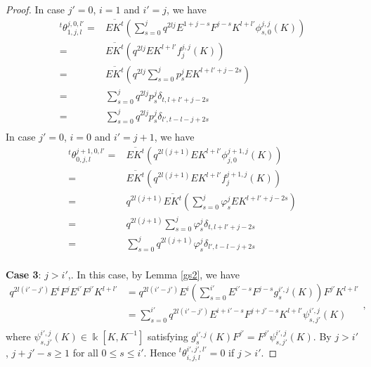\documentclass[10pt,oneside]{amsart}
\theoremstyle{definition}
\def\<{\leqslant}
\def\>{\geqslant}
\begin{document}
\begin{proof}
In case $j'=0$, $i=1$ and $i'=j$, we have
$$\begin{array}{rl}
{^t\theta^{j,0,l'}_{1,j,l}}
=&\overline{EK^t}(\sum_{s=0}^jq^{2lj}E^{1+j-s}F^{j-s}K^{l+l'}\phi^{j,j}_{s,0}(K))\\
=&\overline{EK^t}(q^{2lj}EK^{l+l'}f^{j,j}_j(K))\\
=&\overline{EK^t}(q^{2lj}\sum_{s=0}^jp^j_sEK^{l+l'+j-2s})\\
=&\sum_{s=0}^{j}q^{2lj}p^j_s\delta_{t,l+l'+j-2s}\\
=&\sum_{s=0}^{j}q^{2lj}p^j_s\delta_{l',t-l-j+2s}\\\end{array}$$
In case $j'=0$, $i=0$ and $i'=j+1$, we have
$$\begin{array}{rl}
{^t\theta^{j+1,0,l'}_{0,j,l}}
=&\overline{EK^t}(q^{2l(j+1)}EK^{l+l'}\phi^{j+1,j}_{j,0}(K))\\
=&\overline{EK^t}(q^{2l(j+1)}EK^{l+l'}f^{j+1,j}_j(K))\\
=&q^{2l(j+1)}\overline{EK^t}(\sum_{s=0}^j\varphi^j_sEK^{l+l'+j-2s})\\
=&q^{2l(j+1)}\sum_{s=0}^{j}\varphi^j_s\delta_{t,l+l'+j-2s}\\
=&\sum_{s=0}^{j}q^{2l(j+1)}\varphi^j_s\delta_{l',t-l-j+2s}\\\end{array}$$

{\bf Case 3}: $j>i'$,. In this case, by Lemma \ref{gs2}, we have
$$\begin{array}{rl}
q^{2l(i'-j')}E^iF^jE^{i'}F^{j'}K^{l+l'}
&=q^{2l(i'-j')}E^i(\sum_{s=0}^{i'}E^{i'-s}F^{j-s}g^{i',j}_s(K))F^{j'}K^{l+l'}\\
&=\sum_{s=0}^{i'}q^{2l(i'-j')}E^{i+i'-s}F^{j+j'-s}K^{l+l'}\psi^{i',j}_{s,j'}(K)\\
\end{array},$$
 where $\psi^{i',j}_{s,j'}(K)\in \Bbbk[K,K^{-1}]$ satisfying $g^{i',j}_s(K)F^{j'}=F^{j'}\psi^{i',j}_{s,j'}(K)$. By $j>i'$, $j+j'-s\>1$ for all $0\<s\<i'$. Hence ${^t\theta^{i',j',l'}_{i,j,l}}=0$ if $j>i'$.


\end{proof}
\end{document}
